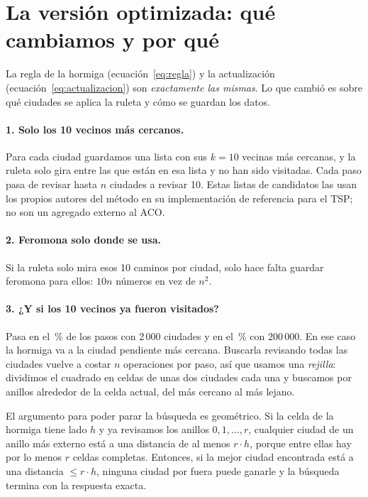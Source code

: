 \documentclass[11pt,a4paper]{article}
\begin{document}
\section{La versión optimizada: qué cambiamos y por qué}

La regla de la hormiga (ecuación~\ref{eq:regla}) y la actualización
(ecuación~\ref{eq:actualizacion}) son \emph{exactamente las mismas}. Lo que cambió es
sobre qué ciudades se aplica la ruleta y cómo se guardan los datos.

\paragraph{1. Solo los 10 vecinos más cercanos.} Para cada ciudad guardamos una lista
con sus $k=10$ vecinas más cercanas, y la ruleta solo gira entre las que están en esa
lista y no han sido visitadas. Cada paso pasa de revisar hasta $n$ ciudades a revisar
10. Estas listas de candidatos las usan los propios autores del método en su
implementación de referencia para el TSP; no son un agregado externo al ACO.

\paragraph{2. Feromona solo donde se usa.} Si la ruleta solo mira esos 10 caminos por
ciudad, solo hace falta guardar feromona para ellos: $10n$ números en vez de $n^2$.

\paragraph{3. ¿Y si los 10 vecinos ya fueron visitados?} Pasa en el \FallbackDosMil\,\%
de los pasos con 2\,000 ciudades y en el \FallbackDoscientosMil\,\% con 200\,000. En ese
caso la hormiga va a la ciudad pendiente más cercana. Buscarla revisando todas las
ciudades vuelve a costar $n$ operaciones por paso, así que usamos una \emph{rejilla}:
dividimos el cuadrado en celdas de unas dos ciudades cada una y buscamos por anillos
alrededor de la celda actual, del más cercano al más lejano.

El argumento para poder parar la búsqueda es geométrico. Si la celda de la hormiga
tiene lado $h$ y ya revisamos los anillos $0,1,\dots,r$, cualquier ciudad de un anillo
más externo está a una distancia de al menos $r\cdot h$, porque entre ellas hay por lo
menos $r$ celdas completas. Entonces, si la mejor ciudad encontrada está a una
distancia $\le r\cdot h$, ninguna ciudad por fuera puede ganarle y la búsqueda termina
con la respuesta exacta.
\end{document}
